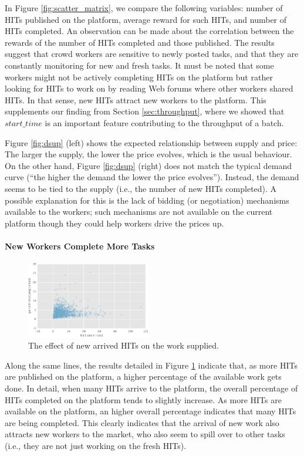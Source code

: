 In Figure \ref{fig:scatter_matrix}, we compare the following variables: number of HITs published on the platform, average reward for such HITs, and number of HITs completed. An observation can be made about the correlation between the rewards of the number of HITs completed and those published. The results suggest that crowd workers are sensitive to newly posted tasks, and that they are constantly monitoring for new and fresh tasks. It must be noted that some workers might not be actively completing HITs on the platform but rather looking for HITs to work on by reading Web forums where other workers shared HITs. In that sense, new HITs attract new workers to the platform. This supplements our finding from Section \ref{sec:throughput}, where we showed that $start\_time$ is an important feature contributing to the throughput of a batch.  

Figure \ref{fig:dsup} (left) shows the expected relationship between supply and price: The larger the supply, the lower the price evolves, which is the usual behaviour. On the other hand, Figure \ref{fig:dsup} (right) does not match the typical demand curve (“the higher the demand the lower the price evolves”).
Instead, the demand seems to be tied to the supply (i.e., the number of new HITs completed). A possible explanation for this is the lack of bidding (or negotiation) mechanisms available to the workers; such mechanisms are not available on the current platform though they could help workers drive the prices up. 

\paragraph{New Workers Complete More Tasks}
\begin{figure}[tb]
	\centering
		\includegraphics[width=0.48\textwidth]{figures/percHitsCompleted}
	\caption{The effect of new arrived HITs on the work  supplied.}
	\label{fig:perc_hits_completed}
\end{figure}
Along the same lines, the results detailed in Figure \ref{fig:perc_hits_completed} indicate that, as more HITs are published on the platform, a higher percentage of the available work gets done. In detail, when many HITs arrive to the platform, the overall percentage of HITs completed on the platform tends to slightly increase. As more HITs are available on the platform, an higher overall percentage indicates that many HITs are being completed. This clearly indicates that the arrival of new work also attracts new workers to the market, who also seem to spill over to other tasks (i.e., they are not just working on the fresh HITs). 

